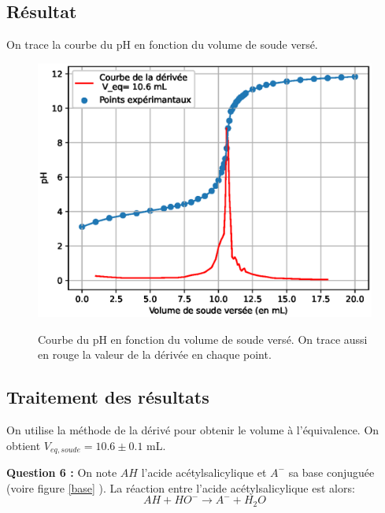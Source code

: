 \documentclass[12pt]{article}
\begin{document}
\newpage
	\subsection{Résultat}
On trace la courbe du pH en fonction du volume de soude versé. 
\begin{figure}[h!]
	\begin{center}
		\includegraphics[scale=0.6]{Titrage_2.eps}
		\label{Titrage2}
		\caption{Courbe du pH en fonction du volume de soude versé. On trace aussi en rouge la valeur de la dérivée en chaque point.}
	\end{center}
\end{figure}

\newpage
	\subsection{Traitement des résultats}
On utilise la méthode de la dérivé pour obtenir le volume à l'équivalence. On obtient $V_{eq,soude}=10.6\pm 0.1$ mL.

\textbf{Question 6 :} On note $AH$ l'acide acétylsalicylique et $A^-$ sa base conjuguée (voire figure \ref{base} ). La réaction entre l'acide acétylsalicylique est alors:
\begin{equation}
AH + HO^- \longrightarrow A^- + H_2O
\label{Acidebase}
\end{equation}
\end{document}
